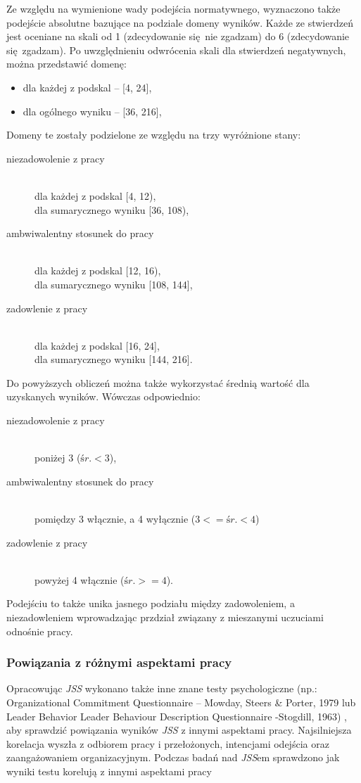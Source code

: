 Ze względu na wymienione wady podejścia normatywnego, wyznaczono także podejście absolutne bazujące na podziale domeny wyników. Każde ze stwierdzeń jest oceniane na skali od 1 (zdecydowanie się nie zgadzam) do 6 (zdecydowanie się zgadzam). Po uwzględnieniu odwrócenia skali dla stwierdzeń negatywnych, można przedstawić domenę:
\begin{itemize}
\item dla każdej z podskal -- [4, 24],
\item dla ogólnego wyniku -- [36, 216],
\end{itemize}
Domeny te zostały podzielone ze względu na trzy wyróżnione stany:
\begin{description}
\item[niezadowolenie z pracy] \hfill \\
dla każdej z podskal [4, 12), \hfill \\ dla sumarycznego wyniku [36, 108),
\item[ambwiwalentny stosunek do pracy] \hfill \\
dla każdej z podskal [12, 16), \hfill \\ dla sumarycznego wyniku [108, 144],
\item[zadowlenie z pracy] \hfill \\
dla każdej z podskal [16, 24], \hfill \\ dla sumarycznego wyniku [144, 216].
\end{description}

Do powyższych obliczeń można także wykorzystać średnią wartość dla uzyskanych wyników. Wówczas odpowiednio:
\begin{description}
\item[niezadowolenie z pracy] \hfill \\ poniżej 3 ($śr. <3$),
\item[ambwiwalentny stosunek do pracy] \hfill \\ pomiędzy 3 włącznie, a 4 wyłącznie ($ 3<= śr. < 4 $)
\item[zadowlenie z pracy] \hfill \\ powyżej 4 włącznie ($ śr. >= 4 $).
\end{description}

Podejściu to także unika jasnego podziału między zadowoleniem, a niezadowleniem wprowadzając przdział związany z mieszanymi uczuciami odnośnie pracy.

\subsubsection{Powiązania z różnymi aspektami pracy}
Opracowując \emph{JSS} wykonano także inne znane testy psychologiczne (np.: Organizational Commitment Questionnaire -- Mowday, Steers \& Porter, 1979 lub Leader Behavior Leader Behaviour Description Questionnaire -Stogdill, 1963) , aby sprawdzić powiązania wyników \emph{JSS} z innymi aspektami pracy. Najsilniejsza korelacja wyszła z odbiorem pracy i przełożonych, intencjami odejścia oraz zaangażowaniem organizacyjnym.
Podczas badań nad \emph{JSS}em sprawdzono jak wyniki testu korelują z innymi aspektami pracy
